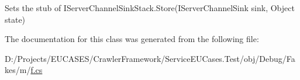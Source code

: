 Sets the stub of I\-Server\-Channel\-Sink\-Stack.\-Store(\-I\-Server\-Channel\-Sink sink, Object state)



The documentation for this class was generated from the following file\-:\begin{DoxyCompactItemize}
\item 
D\-:/\-Projects/\-E\-U\-C\-A\-S\-E\-S/\-Crawler\-Framework/\-Service\-E\-U\-Cases.\-Test/obj/\-Debug/\-Fakes/m/\hyperlink{m_2f_8cs}{f.\-cs}\end{DoxyCompactItemize}
